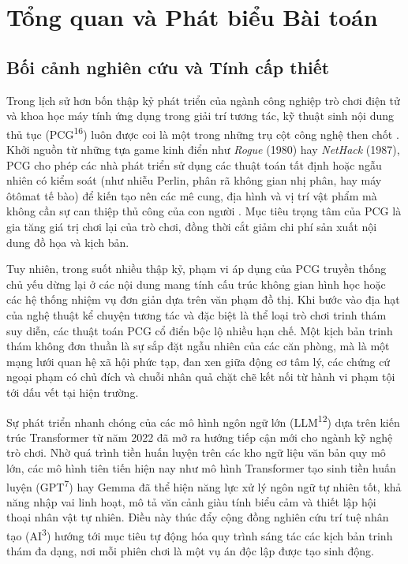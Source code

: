 \chapter{Tổng quan và Phát biểu Bài toán}
\label{ch:introduction}

\section{Bối cảnh nghiên cứu và Tính cấp thiết}
\label{sec:intro_context}

Trong lịch sử hơn bốn thập kỷ phát triển của ngành công nghiệp trò chơi điện tử và khoa học máy tính ứng dụng trong giải trí tương tác, kỹ thuật sinh nội dung thủ tục (PCG\textsuperscript{16}) luôn được coi là một trong những trụ cột công nghệ then chốt \cite{summerville2018procedural}. Khởi nguồn từ những tựa game kinh điển như \textit{Rogue} (1980) hay \textit{NetHack} (1987), PCG cho phép các nhà phát triển sử dụng các thuật toán tất định hoặc ngẫu nhiên có kiểm soát (như nhiễu Perlin, phân rã không gian nhị phân, hay máy ôtômat tế bào) để kiến tạo nên các mê cung, địa hình và vị trí vật phẩm mà không cần sự can thiệp thủ công của con người \cite{short2017procedural}. Mục tiêu trọng tâm của PCG là gia tăng giá trị chơi lại của trò chơi, đồng thời cắt giảm chi phí sản xuất nội dung đồ họa và kịch bản.

Tuy nhiên, trong suốt nhiều thập kỷ, phạm vi áp dụng của PCG truyền thống chủ yếu dừng lại ở các nội dung mang tính cấu trúc không gian hình học hoặc các hệ thống nhiệm vụ đơn giản dựa trên văn phạm đồ thị. Khi bước vào địa hạt của nghệ thuật kể chuyện tương tác và đặc biệt là thể loại trò chơi trinh thám suy diễn, các thuật toán PCG cổ điển bộc lộ nhiều hạn chế. Một kịch bản trinh thám không đơn thuần là sự sắp đặt ngẫu nhiên của các căn phòng, mà là một mạng lưới quan hệ xã hội phức tạp, đan xen giữa động cơ tâm lý, các chứng cứ ngoại phạm có chủ đích và chuỗi nhân quả chặt chẽ kết nối từ hành vi phạm tội tới dấu vết tại hiện trường.

Sự phát triển nhanh chóng của các mô hình ngôn ngữ lớn (LLM\textsuperscript{12}) dựa trên kiến trúc Transformer \cite{vaswani2017attention} từ năm 2022 đã mở ra hướng tiếp cận mới cho ngành kỹ nghệ trò chơi. Nhờ quá trình tiền huấn luyện trên các kho ngữ liệu văn bản quy mô lớn, các mô hình tiên tiến hiện nay như mô hình Transformer tạo sinh tiền huấn luyện (GPT\textsuperscript{7}) \cite{achiam2023gpt4} hay Gemma \cite{gemmateam2024gemma} đã thể hiện năng lực xử lý ngôn ngữ tự nhiên tốt, khả năng nhập vai linh hoạt, mô tả văn cảnh giàu tính biểu cảm và thiết lập hội thoại nhân vật tự nhiên. Điều này thúc đẩy cộng đồng nghiên cứu trí tuệ nhân tạo (AI\textsuperscript{3}) hướng tới mục tiêu tự động hóa quy trình sáng tác các kịch bản trinh thám đa dạng, nơi mỗi phiên chơi là một vụ án độc lập được tạo sinh động.

